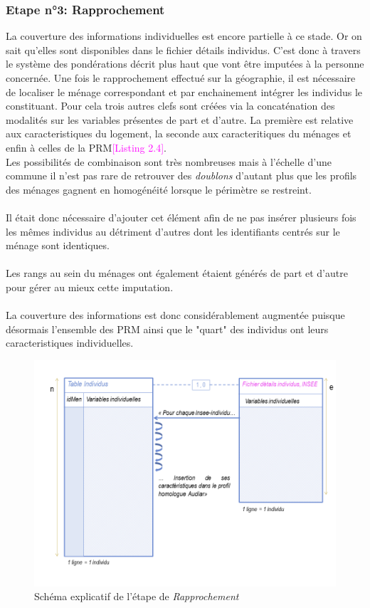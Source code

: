\documentclass{bredele}
\begin{document}
\subsubsection{Etape n°3: \Large{Rapprochement}}
La couverture des informations individuelles est encore partielle à ce stade. Or on sait qu'elles sont disponibles dans le fichier détails individus. C'est donc à travers le système des pondérations décrit plus haut que vont être imputées à la personne concernée. Une fois le rapprochement effectué sur la géographie, il est nécessaire de localiser le ménage correspondant et par enchainement intégrer les individus le constituant. Pour cela trois autres clefs sont créées via la concaténation des modalités sur les variables présentes de part et d'autre. La première est relative aux caracteristiques du logement, la seconde aux caracteritiques du ménages et enfin à celles de la PRM\textcolor{magenta}{[Listing 2.4]}.\\
\newline
Les possibilités de combinaison sont très nombreuses mais à l'échelle d'une commune il n'est pas rare de retrouver des \textit{doublons} d'autant plus que les profils des ménages gagnent en homogénéité lorsque le périmètre se restreint.
\\\\Il était donc nécessaire d'ajouter cet élément afin de ne pas insérer plusieurs fois les mêmes individus au détriment d'autres dont les identifiants centrés sur le ménage sont identiques.
\\\\Les rangs au sein du ménages ont également étaient générés de part et d'autre pour gérer au mieux cette imputation.
\\\\La couverture des informations est donc considérablement augmentée puisque désormais l'ensemble des PRM ainsi que le "quart" des individus ont leurs caracteristiques individuelles.
\begin{figure}\centering
\includegraphics[width=\textwidth]{PROCESSBDD_3}
\caption{Schéma explicatif de l'étape de \textit{Rapprochement}}
\end{figure}
\newpage
\end{document}
